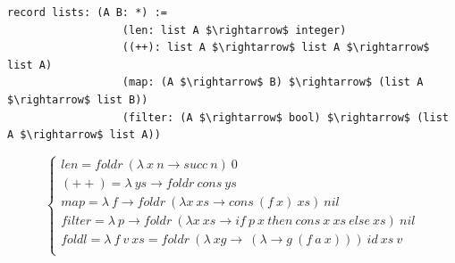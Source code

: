 \documentclass[11pt,oneside]{article}
\begin{document}
\begin{lstlisting}[mathescape=true]
           record lists: (A B: *) :=
                  (len: list A $\rightarrow$ integer)
                  ((++): list A $\rightarrow$ list A $\rightarrow$ list A)
                  (map: (A $\rightarrow$ B) $\rightarrow$ (list A $\rightarrow$ list B))
                  (filter: (A $\rightarrow$ bool) $\rightarrow$ (list A $\rightarrow$ list A))
\end{lstlisting}
$$
\begin{cases}
len = foldr\ (\lambda\ x\ n \rightarrow succ\ n)\ 0\\
(++) = \lambda\ ys \rightarrow foldr\ cons\ ys\\
map = \lambda\ f \rightarrow foldr\ (\lambda x\ xs \rightarrow cons\ (f\ x)\ xs)\ nil\\
filter = \lambda\ p \rightarrow foldr\ (\lambda x\ xs \rightarrow if\ p\ x\ then\ cons\ x\ xs\ else\ xs)\ nil\\
foldl = \lambda\ f\ v\ xs = foldr\ (\lambda\ xg\rightarrow\ (\lambda \rightarrow g\ (f\ a\ x)))\ id\ xs\ v\\
\end{cases}
$$








\end{document}
